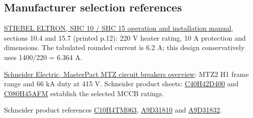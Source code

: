 \subsection*{Manufacturer selection references}
\href{https://www.stiebel-eltron.com/content/dam/ste/cdbassets/current/bedienungs-_u_installationsanleitungen/instructionandinstallationmanual_doc-00060782.pdf}{STIEBEL ELTRON, SHC 10 / SHC 15 operation and installation manual}, sections 10.4 and 15.7 (printed p.12): 220 V heater rating, 10 A protection and dimensions. The tabulated rounded current is 6.2 A; this design conservatively uses 1400/220 = 6.364 A.

\href{https://ckm-content.se.com/ckmContent/sfc/servlet.shepherd/document/download/0691H00000FWgC6QAL}{Schneider Electric, MasterPact MTZ circuit breakers overview}: MTZ2 H1 frame range and 66 kA duty at 415 V. Schneider product sheets: \href{https://www.se.com/nl/nl/product/C40H42D400/compact-vermogenschakelaar-nsx400h-70ka-ac-4p4d-400a-2-3/}{C40H42D400} and \href{https://www.se.com/uk/en/product/C080H45AFM/circuit-breaker-compact-ns800h-70ka-at-415vac-4p-fixed-manually-operated-micrologic-5-0a-control-unit-800a/}{C080H45AFM} establish the selected MCCB ratings.

Schneider product references \href{https://www.se.com/nl/en/product/C10H4TM063/}{C10H4TM063}, \href{https://www.se.com/uk/en/product/A9D31810/ic60h-earth-leakage-circuit-breaker-1p-\%2B-n-b-curve-10-a-30-ma-240-v/}{A9D31810} and \href{https://www.se.com/uk/en/product/A9D31832/ic60h-earth-leakage-circuit-breaker-1p-\%2B-n-b-curve-32-a-30-ma-240-v/}{A9D31832}.

